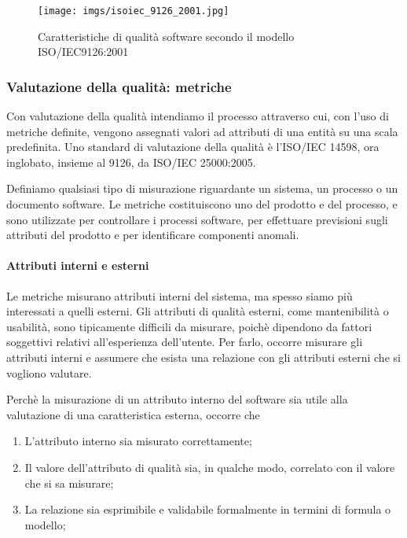 \begin{figure}[h]
  \centering
  \texttt{[image: imgs/isoiec\_9126\_2001.jpg]}
  \caption{Caratteristiche di qualità software secondo il modello
    ISO/IEC9126:2001}
\end{figure}

\subsubsection{Valutazione della qualità: metriche}

Con valutazione della qualità intendiamo il processo attraverso cui, con l'uso
di metriche definite, vengono assegnati valori ad attributi di una entità su una
scala predefinita. Uno standard di valutazione della qualità è l'ISO/IEC 14598,
ora inglobato, insieme al 9126, da ISO/IEC 25000:2005.

Definiamo  qualsiasi tipo di misurazione riguardante un sistema,
un processo o un documento software. Le metriche costituiscono uno
 del prodotto e del processo, e sono
utilizzate per controllare i processi software, per effettuare previsioni sugli
attributi del prodotto e per identificare componenti anomali.

\paragraph{Attributi interni e esterni}

Le metriche misurano attributi interni del sistema, ma spesso siamo più
interessati a quelli esterni. Gli attributi di qualità esterni, come
mantenibilità o usabilità, sono tipicamente difficili da misurare, poichè
dipendono da fattori soggettivi relativi all'esperienza dell'utente. Per farlo,
occorre misurare gli attributi interni e assumere che esista una relazione con
gli attributi esterni che si vogliono valutare.

Perchè la misurazione di un attributo interno del software sia utile alla
valutazione di una caratteristica esterna, occorre che

\begin{enumerate}
  \item L'attributo interno sia misurato correttamente;
  \item Il valore dell'attributo di qualità sia, in qualche modo, correlato con
    il valore che si sa misurare;
  \item La relazione sia esprimibile e validabile formalmente in termini di
    formula o modello;
\end{enumerate}


